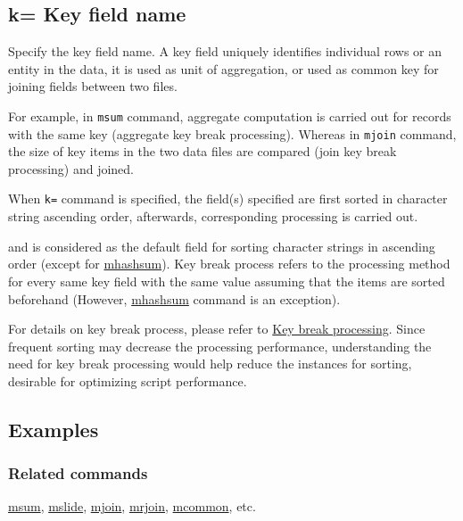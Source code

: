%

\subsection{k= Key field name\label{sect:option_k}}

Specify the key field name.
A key field  uniquely identifies individual rows or an entity in the data, it is used as unit of aggregation, or used as common key for joining fields between two files. 

For example, in  \verb|msum| command,  aggregate computation is carried out for records with the same key (aggregate key break processing).  Whereas in \verb|mjoin| command, the size of key items in the two data files are compared (join key break processing) and joined. 

When \verb|k=| command is specified, the field(s) specified are first sorted in character string ascending order, afterwards, corresponding processing is carried out. 

and is considered as the default field for sorting character strings in ascending order (except for \hyperref[sect:mhashsum]{mhashsum}). 
Key break process refers to the processing method for every same key field with the same value assuming that the items are sorted beforehand (However, \hyperref[sect:mhashsum]{mhashsum} command is an exception). 

For details on key break process, please refer to \hyperref[sect:keybreak]{Key break processing}. 
Since frequent sorting may decrease the processing performance, understanding the need for key break processing would help reduce the instances for sorting, desirable for optimizing script performance. 

\subsection*{Examples}


\subsubsection*{Related commands}
\hyperref[sect:msum]{msum},
\hyperref[sect:mslide]{mslide},
\hyperref[sect:mjoin]{mjoin},
\hyperref[sect:mrjoin]{mrjoin},
\hyperref[sect:mcommon]{mcommon}, etc.

%

